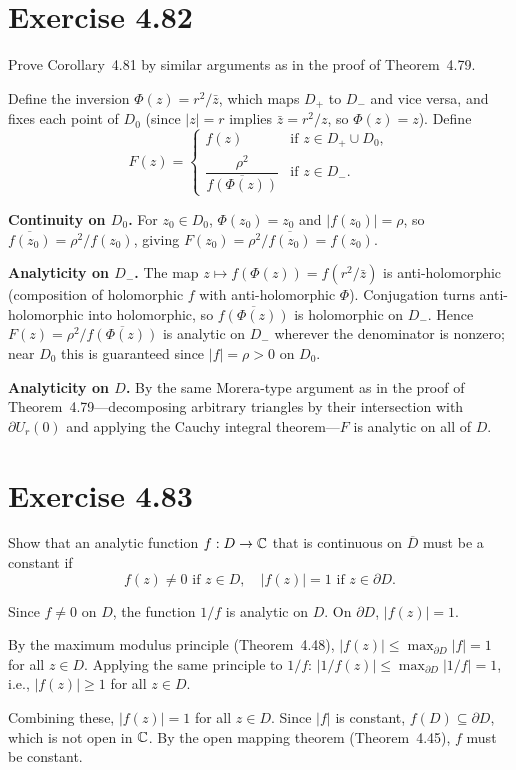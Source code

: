 \documentclass{article}
\begin{document}
\section{Exercise 4.82}

Prove Corollary~4.81 by similar arguments as in the proof of
Theorem~4.79.

\begin{solution}
  Define the inversion $\Phi(z) = r^2/\bar{z}$, which maps $D_+$ to
  $D_-$ and vice versa, and fixes each point of $D_0$ (since
  $|z| = r$ implies $\bar{z} = r^2/z$, so $\Phi(z) = z$).  Define
  \[
    F(z) =
    \begin{cases}
      f(z) & \text{if } z \in D_+ \cup D_0, \\[4pt]
      \dfrac{\rho^2}{\overline{f(\Phi(z))}} & \text{if } z \in D_-.
    \end{cases}
  \]

  \textbf{Continuity on $D_0$.}
  For $z_0 \in D_0$, $\Phi(z_0) = z_0$ and $|f(z_0)| = \rho$, so
  $\overline{f(z_0)} = \rho^2/f(z_0)$, giving
  $F(z_0) = \rho^2/\overline{f(z_0)} = f(z_0)$.

  \textbf{Analyticity on $D_-$.}
  The map $z \mapsto f(\Phi(z)) = f(r^2/\bar{z})$ is anti-holomorphic
  (composition of holomorphic $f$ with anti-holomorphic $\Phi$).
  Conjugation turns anti-holomorphic into holomorphic, so
  $\overline{f(\Phi(z))}$ is holomorphic on $D_-$.
  Hence $F(z) = \rho^2/\overline{f(\Phi(z))}$ is analytic on $D_-$
  wherever the denominator is nonzero; near $D_0$ this is guaranteed
  since $|f| = \rho > 0$ on $D_0$.

  \textbf{Analyticity on $D$.}
  By the same Morera-type argument as in the proof of
  Theorem~4.79---decomposing arbitrary triangles by their intersection
  with $\partial U_r(0)$ and applying the Cauchy integral
  theorem---$F$ is analytic on all of $D$.
\end{solution}

\section{Exercise 4.83}

Show that an analytic function $f : D \to \mathbb{C}$ that is continuous on
$\overline{D}$ must be a constant if
\[
  f(z) \ne 0 \text{ if } z \in D, \quad
  |f(z)| = 1 \text{ if } z \in \partial D.
\]

\begin{solution}
  Since $f \ne 0$ on $D$, the function $1/f$ is analytic on $D$.
  On $\partial D$, $|f(z)| = 1$.

  By the maximum modulus principle (Theorem~4.48),
  $|f(z)| \le \max_{\partial D}|f| = 1$ for all $z \in D$.
  Applying the same principle to $1/f$:
  $|1/f(z)| \le \max_{\partial D}|1/f| = 1$, i.e.,
  $|f(z)| \ge 1$ for all $z \in D$.

  Combining these, $|f(z)| = 1$ for all $z \in D$.
  Since $|f|$ is constant, $f(D) \subseteq \partial D$, which is not
  open in $\mathbb{C}$. By the open mapping theorem (Theorem~4.45), $f$ must
  be constant.
\end{solution}
\end{document}
